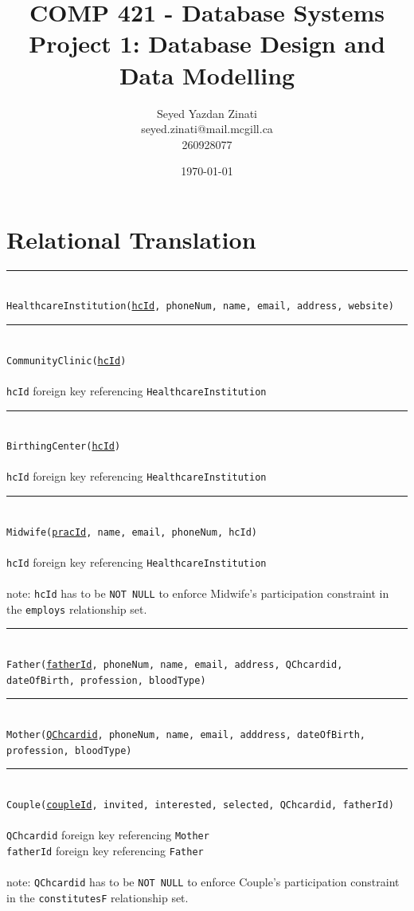 \documentclass[10pt, letterpaper]{article}
\title{COMP 421 - Database Systems \\ 
\large Project 1: Database Design and Data Modelling}
\author{Seyed Yazdan Zinati\\seyed.zinati@mail.mcgill.ca\\ 260928077}
\date{\today}
\newcommand{\code}[1]{\texttt{#1}}
\newcommand{\dline}{\par\noindent\rule{\textwidth}{0.2pt}\\}
\begin{document}
\maketitle

\section*{Relational Translation}

\dline
\code{HealthcareInstitution(\underline{hcId}, phoneNum, name, email, address, website)}
\dline
\code{CommunityClinic(\underline{hcId})}\\
\\
\code{hcId} foreign key referencing \code{HealthcareInstitution}
\dline
\code{BirthingCenter(\underline{hcId})}\\
\\
\code{hcId} foreign key referencing \code{HealthcareInstitution}
\dline
\code{Midwife(\underline{pracId}, name, email, phoneNum, hcId)}\\
\\
\code{hcId} foreign key referencing \code{HealthcareInstitution}\\
\\
note: \code{hcId} has to be \code{NOT NULL} to enforce Midwife's participation constraint in the \code{employs} relationship set.
\dline
\code{Father(\underline{fatherId}, phoneNum, name, email, address, QChcardid, dateOfBirth, profession, bloodType)}
\dline
\code{Mother(\underline{QChcardid}, phoneNum, name, email, adddress, dateOfBirth, profession, bloodType)}
\dline
\code{Couple(\underline{coupleId}, invited, interested, selected, QChcardid, fatherId)}\\
\\
\code{QChcardid} foreign key referencing \code{Mother}\\
\code{fatherId} foreign key referencing \code{Father}\\
\\
note: \code{QChcardid} has to be \code{NOT NULL} to enforce Couple's participation constraint in the \code{constitutesF} relationship set.
\end{document}
